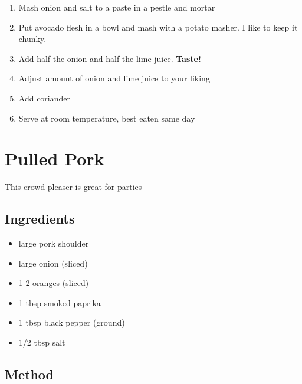 \documentclass[
]{book}
\providecommand{\tightlist}{%
  \setlength{\itemsep}{0pt}\setlength{\parskip}{0pt}}
\begin{document}
\begin{enumerate}
\def\labelenumi{\arabic{enumi}.}
\tightlist
\item
  Mash onion and salt to a paste in a pestle and mortar
\item
  Put avocado flesh in a bowl and mash with a potato masher. I like to keep it chunky.
\item
  Add half the onion and half the lime juice. \textbf{Taste!}
\item
  Adjust amount of onion and lime juice to your liking
\item
  Add coriander
\item
  Serve at room temperature, best eaten same day
\end{enumerate}

\hypertarget{pulled-pork}{%
\chapter{Pulled Pork}\label{pulled-pork}}

This crowd pleaser is great for parties

\hypertarget{ingredients-2}{%
\section{Ingredients}\label{ingredients-2}}

\begin{itemize}
\tightlist
\item
  large pork shoulder
\item
  large onion (sliced)
\item
  1-2 oranges (sliced)
\item
  1 tbsp smoked paprika
\item
  1 tbsp black pepper (ground)
\item
  1/2 tbsp salt
\end{itemize}

\hypertarget{method-2}{%
\section{Method}\label{method-2}}
\end{document}
